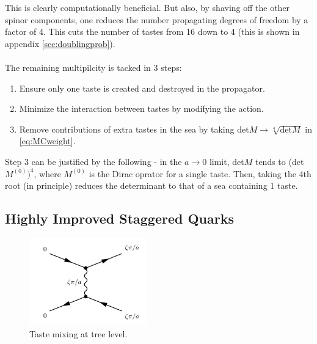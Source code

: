 This is clearly computationally beneficial. But also, by shaving off the other spinor components, one reduces the number propagating degrees of freedom by a factor of 4. This cuts the number of tastes from 16 down to 4 (this is shown in appendix \ref{sec:doublingprob}).
\\ \\
The remaining multipilcity is tacked in 3 steps:
\begin{enumerate}
	\item
	Ensure only one taste is created and destroyed in the propagator.
	\item
	Minimize the interaction between tastes by modifying the action.
	\item
	Remove contributions of extra tastes in the sea by taking det$M \to \sqrt[4]{\text{det}M}$ in \eqref{eq:MCweight}.
\end{enumerate}
Step 3 can be justified by the following - in the $a\to 0$ limit, det$M$ tends to (det$M^{(0)})^4$, where $M^{(0)}$ is the Dirac oprator for a single taste. Then, taking the 4th root (in principle) reduces the determinant to that of a sea containing 1 taste.

\subsection{Highly Improved Staggered Quarks}


\begin{figure}
  \begin{center}
    \includegraphics[width=
   0.45\textwidth]{images/tastemixing.jpg}
  \end{center}
  \caption{Taste mixing at tree level.}
  \label{fig:tastemixing}
\end{figure}

